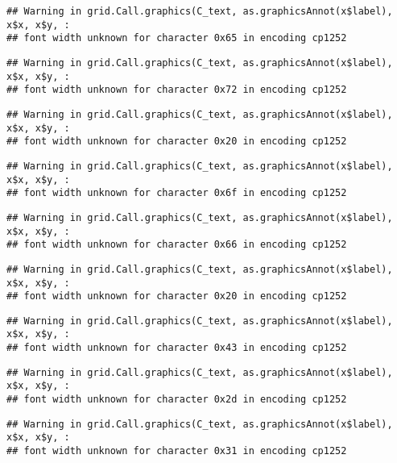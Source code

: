 \documentclass[
]{article}
\begin{document}
\begin{verbatim}
## Warning in grid.Call.graphics(C_text, as.graphicsAnnot(x$label), x$x, x$y, :
## font width unknown for character 0x65 in encoding cp1252
\end{verbatim}

\begin{verbatim}
## Warning in grid.Call.graphics(C_text, as.graphicsAnnot(x$label), x$x, x$y, :
## font width unknown for character 0x72 in encoding cp1252
\end{verbatim}

\begin{verbatim}
## Warning in grid.Call.graphics(C_text, as.graphicsAnnot(x$label), x$x, x$y, :
## font width unknown for character 0x20 in encoding cp1252
\end{verbatim}

\begin{verbatim}
## Warning in grid.Call.graphics(C_text, as.graphicsAnnot(x$label), x$x, x$y, :
## font width unknown for character 0x6f in encoding cp1252
\end{verbatim}

\begin{verbatim}
## Warning in grid.Call.graphics(C_text, as.graphicsAnnot(x$label), x$x, x$y, :
## font width unknown for character 0x66 in encoding cp1252
\end{verbatim}

\begin{verbatim}
## Warning in grid.Call.graphics(C_text, as.graphicsAnnot(x$label), x$x, x$y, :
## font width unknown for character 0x20 in encoding cp1252
\end{verbatim}

\begin{verbatim}
## Warning in grid.Call.graphics(C_text, as.graphicsAnnot(x$label), x$x, x$y, :
## font width unknown for character 0x43 in encoding cp1252
\end{verbatim}

\begin{verbatim}
## Warning in grid.Call.graphics(C_text, as.graphicsAnnot(x$label), x$x, x$y, :
## font width unknown for character 0x2d in encoding cp1252
\end{verbatim}

\begin{verbatim}
## Warning in grid.Call.graphics(C_text, as.graphicsAnnot(x$label), x$x, x$y, :
## font width unknown for character 0x31 in encoding cp1252
\end{verbatim}
\end{document}
